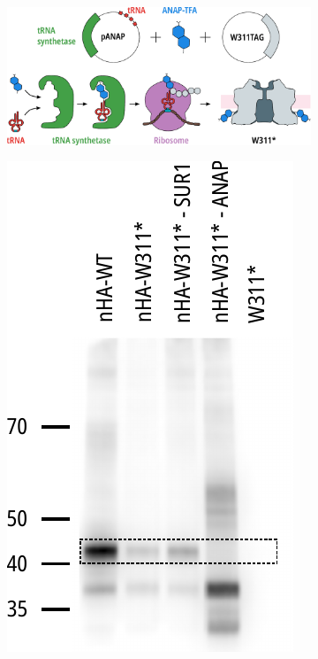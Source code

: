 \begin{figure}[hbtp]
	\centering
	\begin{subfigure}[t]{0.9\textwidth}
		\caption{}\label{ch3fig:amber_codon}
		\centering
		\includegraphics[width=\textwidth]{amber_codon.pdf}
	\end{subfigure}
	\vfill
	\begin{subfigure}[t]{0.25\textwidth}
		\caption{}\label{ch3fig:western_1}
		\centering
		\includegraphics[width=\textwidth]{western_1.pdf}

\end{subfigure}
\end{figure}
